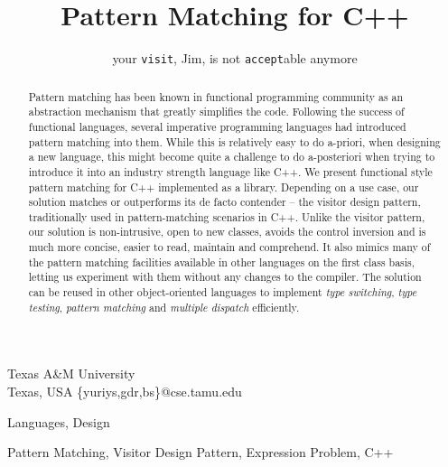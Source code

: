 \documentclass[preprint]{sigplanconf}
\makeatletter
\DeclareRobustCommand{\code}[1]{{\lstinline[breaklines=false,escapechar=@]{#1}}}
\makeatother
\begin{document}
\copyrightdata{[to be supplied]} 


\title{Pattern Matching for C++}
\subtitle{your \code{visit}, Jim, is not \code{accept}able anymore}

           {Texas A\&M University\\ Texas, USA}
           {\{yuriys,gdr,bs\}@cse.tamu.edu}

\maketitle

\begin{abstract}
Pattern matching has been known in functional programming community as an 
abstraction mechanism that greatly simplifies the code. Following the success of 
functional languages, several imperative programming languages had introduced 
pattern matching into them. While this is relatively easy to do a-priori, when 
designing a new language, this might become quite a challenge to do a-posteriori 
when trying to introduce it into an industry strength language like C++. We 
present functional style pattern matching for C++ implemented as a library. 
Depending on a use case, our solution matches or outperforms its de facto 
contender -- the visitor design pattern, traditionally used in pattern-matching 
scenarios in C++. Unlike the visitor pattern, our solution is non-intrusive, 
open to new classes, avoids the control inversion and is much more concise, 
easier to read, maintain and comprehend. It also mimics many of the pattern 
matching facilities available in other languages on the first class basis, 
letting us experiment with them without any changes to the compiler. The 
solution can be reused in other object-oriented languages to implement
\emph{type switching}, \emph{type testing}, \emph{pattern matching} and 
\emph{multiple dispatch} efficiently.
\end{abstract}


\terms
Languages, Design

\keywords
Pattern Matching, Visitor Design Pattern, Expression Problem, C++
\end{document}

